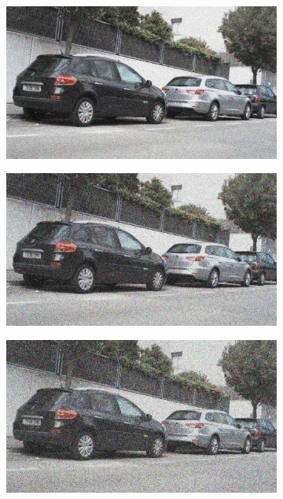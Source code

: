 \documentclass[a4paper]{ctexart}
\begin{document}
\begin{figure}[htbp]
\begin{subfigure}{0.08\textwidth}
			\label{fig：Gamma=0.8, Gauss Noise = 0.1}
		\end{subfigure}
		\begin{subfigure}{0.08\textwidth}
			\captionsetup{font=scriptsize}
			\includegraphics[width=\linewidth]{picture/Edge Detection/degrade/RGB_001 Gamma=0.8, Gauss Noise=0.2}
			\label{fig：Gamma=0.8, Gauss Noise = 0.2}
		\end{subfigure}
		\begin{subfigure}{0.08\textwidth}
			\captionsetup{font=scriptsize}
			\includegraphics[width=\linewidth]{picture/Edge Detection/degrade/RGB_001 Gamma=0.8, Gauss Noise=0.3}
			\label{fig：Gamma=0.8, Gauss Noise = 0.3}
		\end{subfigure}
		\begin{subfigure}{0.08\textwidth}
			\captionsetup{font=scriptsize}
			\includegraphics[width=\linewidth]{picture/Edge Detection/degrade/RGB_001 Gamma=0.8, Gauss Noise=0.4}

\end{subfigure}
\end{figure}
\end{document}

